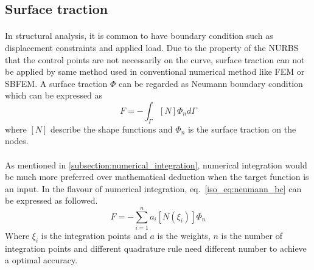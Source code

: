 \subsection{Surface traction}
\label{subsection:surface_traction}
\paragraph{}
In structural analysis, it is common to have boundary condition such as displacement constraints and applied load.
Due to the property of the NURBS that the control points are not necessarily on the curve, surface traction can not be
    applied by same method used in conventional numerical method like FEM or SBFEM.
A surface traction $\Phi$ can be regarded as Neumann boundary condition which can be expressed as
    \begin{equation}
        {F}=-\int_{\Gamma}
        [N]
        \Phi_n
        d\Gamma
    \label{iso_eq:neumann_bc}
    \end{equation}
where $[N]$ describe the shape functions and $\Phi_n$ is the surface traction on the nodes.

\paragraph{}
As mentioned in \ref{subsection:numerical_integration}, numerical integration would be much more preferred over mathematical deduction
when the target function is an input. In the flavour of numerical integration, eq.~\ref{iso_eq:neumann_bc} can be expressed as followed.
    \begin{equation}
        {F}=-\sum_{i=1}^n
        a_i
        [N(\xi_i)]
        \Phi_n
    \label{iso_eq:neumann_bc_numerical}
    \end{equation}
Where $\xi_i$ is the integration points and $a$ is the weights,
$n$ is the number of integration points and different quadrature rule need different number to achieve a optimal accuracy.

